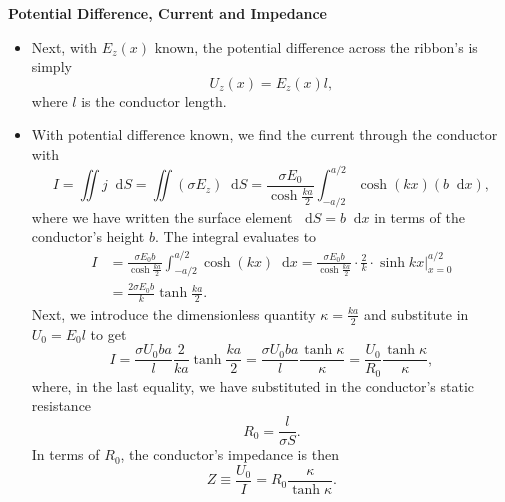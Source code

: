 \documentclass[11pt, a4paper]{article}
\newcommand{\diff}{\mathop{}\!\mathrm{d}} %
\begin{document}
\textbf{Potential Difference, Current and Impedance}
\begin{itemize}
	
	\item Next, with $ E_{z}(x) $ known, the potential difference across the ribbon's is simply
	\begin{equation*}
		U_{z}(x) = E_{z}(x) l,
	\end{equation*}
	where $ l $ is the conductor length. 
	
	\item With potential difference known, we find the current through the conductor with
	\begin{equation*}
		I = \iint j \diff S = \iint (\sigma E_{z}) \diff S = \frac{\sigma E_{0}}{\cosh \frac{ka}{2}} \int_{-a/2}^{a/2} \cosh(kx) (b \diff x),
	\end{equation*}
	where we have written the surface element $ \diff S = b \diff x $ in terms of the conductor's height $ b $. The integral evaluates to
	\begin{align*}
		I &= \frac{\sigma E_{0} b}{\cosh \frac{ka}{2}} \int_{-a/2}^{a/2} \cosh(kx) \diff x =  \frac{\sigma E_{0} b}{\cosh \frac{ka}{2}}  \cdot \frac{2}{k} \cdot \sinh kx \Big |_{x = 0}^{a/2} \\
		& =  \frac{2\sigma E_{0} b}{k} \tanh \frac{ka}{2}.
	\end{align*} 
	Next, we introduce the dimensionless quantity $ \kappa = \frac{ka}{2} $ and substitute in $ U_{0} = E_{0} l$ to get
	\begin{equation*}
		I = \frac{\sigma U_{0} b a}{l} \frac{2}{ka}\tanh \frac{ka}{2} = \frac{\sigma U_{0} b a}{l} \frac{\tanh \kappa}{\kappa} = \frac{U_{0}}{R_{0}} \frac{\tanh \kappa}{\kappa},
	\end{equation*}
	where, in the last equality, we have substituted in the conductor's static resistance
	\begin{equation*}
		R_{0} = \frac{l}{\sigma S}.
	\end{equation*}
	In terms of $ R_{0} $, the conductor's impedance is then
	\begin{equation*}
		Z \equiv \frac{U_{0}}{I} = R_{0}\frac{\kappa}{\tanh \kappa}.
	\end{equation*}
\end{itemize}	
\end{document}
